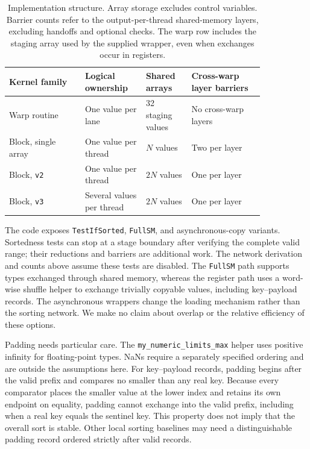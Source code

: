 \documentclass[fleqn,10pt,lineno]{wlpeerj}
\begin{document}
\begin{table}[tb]
\centering
\small
\begin{tabular}{p{0.25\linewidth}p{0.20\linewidth}p{0.15\linewidth}p{0.24\linewidth}}
\toprule
Kernel family & Logical ownership & Shared arrays & Cross-warp layer barriers\\
\midrule
Warp routine & One value per lane & 32 staging values & No cross-warp layers\\
Block, single array & One value per thread & $N$ values & Two per layer\\
Block, \texttt{v2} & One value per thread & $2N$ values & One per layer\\
Block, \texttt{v3} & Several values per thread & $2N$ values & One per layer\\
\bottomrule
\end{tabular}
\caption{Implementation structure. Array storage excludes control variables. Barrier counts refer to the output-per-thread shared-memory layers, excluding handoffs and optional checks. The warp row includes the staging array used by the supplied wrapper, even when exchanges occur in registers.}
\label{tab:variants}
\end{table}

The code exposes \texttt{TestIfSorted}, \texttt{FullSM}, and asynchronous-copy variants. Sortedness tests can stop at a stage boundary after verifying the complete valid range; their reductions and barriers are additional work. The network derivation and counts above assume these tests are disabled. The \texttt{FullSM} path supports types exchanged through shared memory, whereas the register path uses a word-wise shuffle helper to exchange trivially copyable values, including key--payload records. The asynchronous wrappers change the loading mechanism rather than the sorting network. We make no claim about overlap or the relative efficiency of these options.

Padding needs particular care. The \texttt{my\_numeric\_limits\_max} helper uses positive infinity for floating-point types. NaNs require a separately specified ordering and are outside the assumptions here. For key--payload records, padding begins after the valid prefix and compares no smaller than any real key. Because every comparator places the smaller value at the lower index and retains its own endpoint on equality, padding cannot exchange into the valid prefix, including when a real key equals the sentinel key. This property does not imply that the overall sort is stable. Other local sorting baselines may need a distinguishable padding record ordered strictly after valid records.
\end{document}
